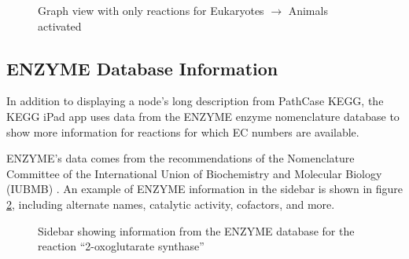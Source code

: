 \begin{figure}[hbt]
    \caption{\label{fig:kegg_screenshot_animals_only_graph} Graph view with only
    reactions for Eukaryotes $\rightarrow$ Animals activated}
\end{figure}

\subsection{ENZYME Database Information}

In addition to displaying a node's long description from PathCase KEGG, the KEGG
iPad app uses data from the ENZYME enzyme nomenclature database to show more
information for reactions for which EC numbers are available.

ENZYME's data comes from the recommendations of the Nomenclature Committee of
the International Union of Biochemistry and Molecular Biology (IUBMB)
\cite{enzyme-database}. An example of ENZYME information in the sidebar is shown
in figure \ref{fig:kegg_screenshot_selection_info}, including alternate names,
catalytic activity, cofactors, and more.

\begin{figure}[hbt]
    \caption{\label{fig:kegg_screenshot_selection_info} Sidebar showing
    information from the ENZYME database for the reaction ``2-oxoglutarate
    synthase''}
\end{figure}
